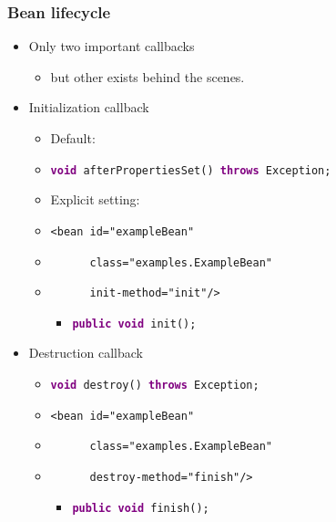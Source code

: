 \documentclass[10pt,xcolor=pdflatex, table]{beamer}
\begin{document}
\begin{frame}[fragile]\frametitle{Bean lifecycle}
	\begin{itemize}
		\item Only two important callbacks
          \begin{itemize}
        	\item but other exists behind the scenes.
          \end{itemize}
		\item Initialization callback
          \begin{itemize}
        	\item Default: 
            \item[] \texttt{\textcolor{purple}{\textbf{void}} afterPropertiesSet() \textcolor{purple}{\textbf{throws}} Exception;}
            \item Explicit setting:
            \item[] \verb+<bean id="exampleBean"+
            \item[] \verb+      class="examples.ExampleBean"+
            \item[] \verb+      init-method="init"/>+
              \begin{itemize}
                \item \texttt{\textcolor{purple}{\textbf{public void}} init();}
              \end{itemize}
          \end{itemize}
		\item Destruction callback
          \begin{itemize}
        	\item \texttt{\textcolor{purple}{\textbf{void}} destroy() \textcolor{purple}{\textbf{throws}} Exception;}
            \item \verb+<bean id="exampleBean"+
            \item[] \verb+      class="examples.ExampleBean"+
            \item[] \verb+      destroy-method="finish"/>+
              \begin{itemize}
                \item \texttt{\textcolor{purple}{\textbf{public void}} finish();}
              \end{itemize}
          \end{itemize}
	\end{itemize}
\end{frame}
\end{document}
